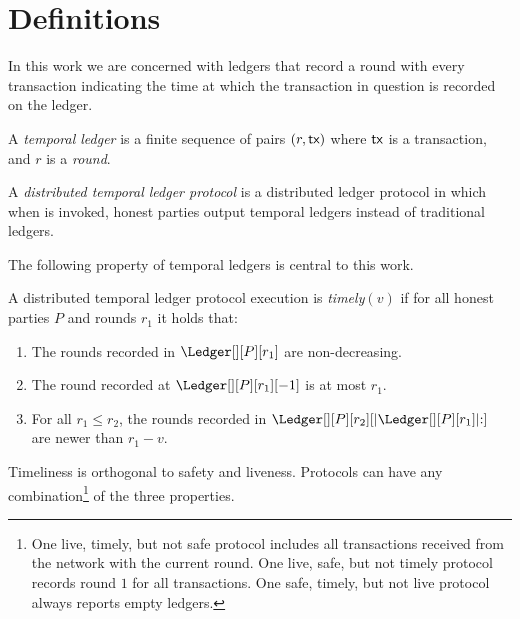 \section{Definitions}\label{sec:defs}

In this work we are concerned with ledgers that
record a round with every transaction indicating the time at which
the transaction in question is recorded on the ledger.

\begin{definition}
  A \emph{temporal ledger} is a finite sequence of pairs $(r, \textsf{tx})$ where $\textsf{tx}$ is
  a transaction, and $r$ is a \emph{round}.
\end{definition}

\begin{definition}
  A \emph{distributed temporal ledger protocol} is a distributed ledger protocol
  in which when \rread is invoked, honest parties output temporal ledgers instead of traditional ledgers.
\end{definition}

The following property of temporal ledgers is central to this work.

\begin{definition}[Timely]\label{def:timely}
  A distributed temporal ledger protocol execution is \emph{timely}$(v)$
  if for all honest parties $P$ and rounds $r_1$ it holds that:

  \begin{enumerate}
    \item The rounds recorded in $\Ledger[][P][r_1]$ are non-decreasing.\label{def:timely-increasing}
    \item The round recorded at $\Ledger[][P][r_1][-1]$ is at most $r_1$.\label{def:timely-past}
    \item For all $r_1 \leq r_2$, the rounds recorded in $\Ledger[][P][r_2][|\Ledger[][P][r_1]|{:}]$ are
          newer than $r_1 - v$.\label{def:timely-chunk}
  \end{enumerate}
\end{definition}

Timeliness is orthogonal to safety and liveness. Protocols can have any
combination\footnote{One live, timely, but not safe protocol includes all transactions
received from the network with the current round.
One live, safe, but not timely protocol records round $1$ for all transactions.
One safe, timely, but not live protocol always reports empty ledgers.}
of the three properties.

